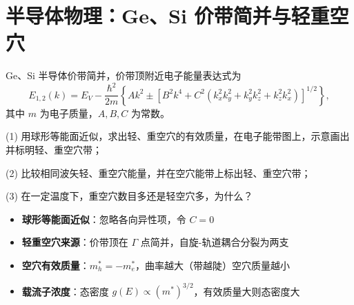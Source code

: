 \section{半导体物理：Ge、Si 价带简并与轻重空穴}
\label{sec:ge-si-valence-band}

\begin{modelbox}[题目：Ge、Si 半导体价带简并分析]
Ge、Si 半导体价带简并，价带顶附近电子能量表达式为
\[
E_{1,2}(k)=E_V-\frac{\hbar^2}{2m}\left\{Ak^2\pm\left[B^2k^4+C^2(k_x^2k_y^2+k_y^2k_z^2+k_z^2k_x^2)\right]^{1/2}\right\},
\]
其中 $m$ 为电子质量，$A,B,C$ 为常数。

(1) 用球形等能面近似，求出轻、重空穴的有效质量，在电子能带图上，示意画出并标明轻、重空穴带；

(2) 比较相同波矢轻、重空穴能量，并在空穴能带上标出轻、重空穴带；

(3) 在一定温度下，重空穴数目多还是轻空穴多，为什么？
\end{modelbox}

\begin{tipbox}[考点快速分析]
\begin{itemize}
    \item \textbf{球形等能面近似}：忽略各向异性项，令 $C=0$
    \item \textbf{轻重空穴来源}：价带顶在 $\Gamma$ 点简并，自旋-轨道耦合分裂为两支
    \item \textbf{空穴有效质量}：$m_h^*=-m_e^*$，曲率越大（带越陡）空穴质量越小
    \item \textbf{载流子浓度}：态密度 $g(E)\propto (m^*)^{3/2}$，有效质量大则态密度大
\end{itemize}
\end{tipbox}


